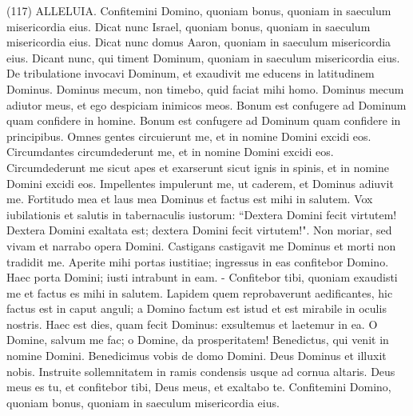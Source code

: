 \begin{biblechapter}  (117) 
\verse ALLELUIA. Confitemini Domino, quoniam bonus, quoniam in saeculum misericordia eius. 
\verse Dicat nunc Israel, quoniam bonus, quoniam in saeculum misericordia eius. 
\verse Dicat nunc domus Aaron, quoniam in saeculum misericordia eius. 
\verse Dicant nunc, qui timent Dominum, quoniam in saeculum misericordia eius. 
\verse De tribulatione invocavi Dominum, et exaudivit me educens in latitudinem Dominus. 
\verse Dominus mecum, non timebo, quid faciat mihi homo. 
\verse Dominus mecum adiutor meus, et ego despiciam inimicos meos. 
\verse Bonum est confugere ad Dominum quam confidere in homine. 
\verse Bonum est confugere ad Dominum quam confidere in principibus. 
\verse Omnes gentes circuierunt me, et in nomine Domini excidi eos. 
\verse Circumdantes circumdederunt me, et in nomine Domini excidi eos. 
\verse Circumdederunt me sicut apes et exarserunt sicut ignis in spinis, et in nomine Domini excidi eos. 
\verse Impellentes impulerunt me, ut caderem, et Dominus adiuvit me. 
\verse Fortitudo mea et laus mea Dominus et factus est mihi in salutem. 
\verse Vox iubilationis et salutis in tabernaculis iustorum: “Dextera Domini fecit virtutem! 
\verse Dextera Domini exaltata est; dextera Domini fecit virtutem!". 
\verse Non moriar, sed vivam et narrabo opera Domini. 
\verse Castigans castigavit me Dominus et morti non tradidit me. 
\verse Aperite mihi portas iustitiae; ingressus in eas confitebor Domino. 
\verse Haec porta Domini; iusti intrabunt in eam. - 
\verse Confitebor tibi, quoniam exaudisti me et factus es mihi in salutem. 
\verse Lapidem quem reprobaverunt aedificantes, hic factus est in caput anguli; 
\verse a Domino factum est istud et est mirabile in oculis nostris. 
\verse Haec est dies, quam fecit Dominus: exsultemus et laetemur in ea. 
\verse O Domine, salvum me fac; o Domine, da prosperitatem! 
\verse Benedictus, qui venit in nomine Domini. Benedicimus vobis de domo Domini. 
\verse Deus Dominus et illuxit nobis. Instruite sollemnitatem in ramis condensis usque ad cornua altaris. 
\verse Deus meus es tu, et confitebor tibi, Deus meus, et exaltabo te. 
\verse Confitemini Domino, quoniam bonus, quoniam in saeculum misericordia eius. 
\end{biblechapter}

